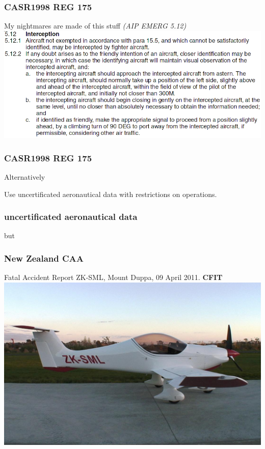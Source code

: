 \begin{frame}
\frametitle{CASR1998 REG 175}
\begin{block}{My nightmares are made of this stuff \tiny{\emph{(AIP EMERG 5.12)}}}
\includegraphics[height=0.5\textheight]{image/ersa-interception.png}
\end{block}
\end{frame}

\begin{frame}
\frametitle{CASR1998 REG 175}
\begin{block}{Alternatively}
\begin{center}
Use uncertificated aeronautical data with restrictions on operations.
\end{center}
\end{block}
\end{frame}

\begin{frame}
\frametitle{uncertificated aeronautical data}
\large
\begin{center}
but
\end{center}
\end{frame}

\begin{frame}
\frametitle{New Zealand CAA}
\begin{block}{Fatal Accident Report ZK-SML, Mount Duppa, 09 April 2011. \textbf{CFIT}}
\includegraphics[height=0.5\textheight]{image/zk-sml.jpg}
\end{block}
\end{frame}

